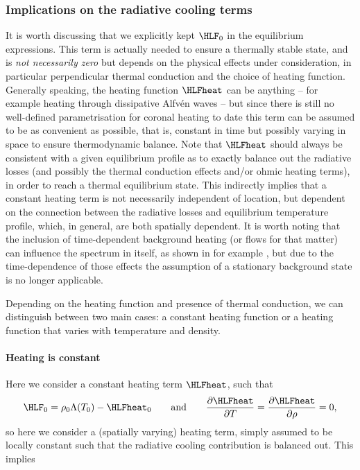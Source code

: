 \subsubsection{Implications on the radiative cooling terms}
It is worth discussing that we explicitly kept $\HLF_0$ in the equilibrium expressions. This term is actually needed to ensure a thermally stable state, and is \emph{not necessarily zero} but depends on the physical effects under consideration, in particular perpendicular thermal conduction and the choice of heating function. Generally speaking, the heating function $\HLFheat$ can be anything -- for example heating through dissipative Alfv\'en waves \citep{vanderholst2014} -- but since there is still no well-defined parametrisation for coronal heating to date this term can be assumed to be as convenient as possible, that is, constant in time but possibly varying in space to ensure thermodynamic balance. Note that $\HLFheat$ should always be consistent with a given equilibrium profile as to exactly balance out the radiative losses (and possibly the thermal conduction effects and/or ohmic heating terms), in order to reach a thermal equilibrium state. This indirectly implies that a constant heating term is not necessarily independent of location, but dependent on the connection between the radiative losses and equilibrium temperature profile, which, in general, are both spatially dependent. It is worth noting that the inclusion of time-dependent background heating (or flows for that matter) can influence the spectrum in itself, as shown in for example \citet{barbulescu2019, hillier2019}, but due to the time-dependence of those effects the assumption of a stationary background state is no longer applicable.

Depending on the heating function and presence of thermal conduction, we can distinguish between two main cases: a constant heating function or a heating function that varies with temperature and density.

\paragraph{Heating is constant}
Here we consider a constant heating term $\HLFheat$, such that
\begin{equation}
  \HLF_0 = \rho_0\Lambda(T_0) - \HLFheat_0
  \qquad
  \text{and}
  \qquad
  \frac{\partial \HLFheat}{\partial T} = \frac{\partial \HLFheat}{\partial \rho} = 0,
\end{equation}
so here we consider a (spatially varying) heating term, simply assumed to be locally constant such that the radiative cooling contribution is balanced out. This implies

